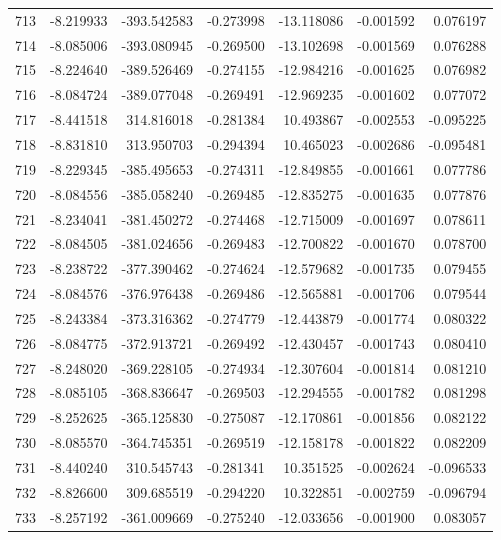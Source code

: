 \begin{tabular}{rrrrrrr}
 713 &  -8.219933 & -393.542583 & -0.273998 &  -13.118086 &   -0.001592 &  0.076197 \\
 714 &  -8.085006 & -393.080945 & -0.269500 &  -13.102698 &   -0.001569 &  0.076288 \\
 715 &  -8.224640 & -389.526469 & -0.274155 &  -12.984216 &   -0.001625 &  0.076982 \\
 716 &  -8.084724 & -389.077048 & -0.269491 &  -12.969235 &   -0.001602 &  0.077072 \\
 717 &  -8.441518 &  314.816018 & -0.281384 &   10.493867 &   -0.002553 & -0.095225 \\
 718 &  -8.831810 &  313.950703 & -0.294394 &   10.465023 &   -0.002686 & -0.095481 \\
 719 &  -8.229345 & -385.495653 & -0.274311 &  -12.849855 &   -0.001661 &  0.077786 \\
 720 &  -8.084556 & -385.058240 & -0.269485 &  -12.835275 &   -0.001635 &  0.077876 \\
 721 &  -8.234041 & -381.450272 & -0.274468 &  -12.715009 &   -0.001697 &  0.078611 \\
 722 &  -8.084505 & -381.024656 & -0.269483 &  -12.700822 &   -0.001670 &  0.078700 \\
 723 &  -8.238722 & -377.390462 & -0.274624 &  -12.579682 &   -0.001735 &  0.079455 \\
 724 &  -8.084576 & -376.976438 & -0.269486 &  -12.565881 &   -0.001706 &  0.079544 \\
 725 &  -8.243384 & -373.316362 & -0.274779 &  -12.443879 &   -0.001774 &  0.080322 \\
 726 &  -8.084775 & -372.913721 & -0.269492 &  -12.430457 &   -0.001743 &  0.080410 \\
 727 &  -8.248020 & -369.228105 & -0.274934 &  -12.307604 &   -0.001814 &  0.081210 \\
 728 &  -8.085105 & -368.836647 & -0.269503 &  -12.294555 &   -0.001782 &  0.081298 \\
 729 &  -8.252625 & -365.125830 & -0.275087 &  -12.170861 &   -0.001856 &  0.082122 \\
 730 &  -8.085570 & -364.745351 & -0.269519 &  -12.158178 &   -0.001822 &  0.082209 \\
 731 &  -8.440240 &  310.545743 & -0.281341 &   10.351525 &   -0.002624 & -0.096533 \\
 732 &  -8.826600 &  309.685519 & -0.294220 &   10.322851 &   -0.002759 & -0.096794 \\
 733 &  -8.257192 & -361.009669 & -0.275240 &  -12.033656 &   -0.001900 &  0.083057 \\

\end{tabular}

